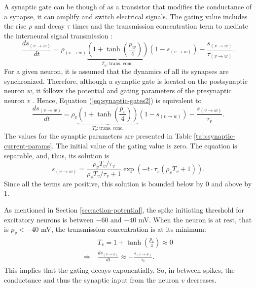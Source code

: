 A synaptic gate can be though of as a transistor that modifies the conductance of a synapse, it can amplify and switch electrical signals. The gating value includes the rise $\rho$ and decay $\tau$ times and the transmission concentration term to mediate the interneural signal transmission \cite{Destexhe1994}:
\begin{equation}
    \frac{ds_{(v \to w)}}{dt} = \rho_{(v \to w)} \underbrace{\left( 1 + \tanh \left( \frac{p_{w}}{4} \right) \right)}_{T_w: \text{trans. conc.}} (1 - s_{(v \to w)}) - \frac{s_{(v \to w)}}{\tau_{(v \to w)}}.
    \label{eq:synaptic-gates2}
\end{equation}
For a given neuron, it is assumed that the dynamics of all its synapses are synchronized. Therefore, although a synaptic gate is located on the postsynaptic neuron $w$, it follows the potential and gating parameters of the presynaptic neuron $v$ \cite{Lowet2015}. Hence, Equation (\ref{eq:synaptic-gates2}) is equivalent to
\begin{equation}
    \frac{ds_{(v \to w)}}{dt} = \rho_{v} \underbrace{\left( 1 + \tanh \left( \frac{p_{v}}{4} \right) \right)}_{T_v: \text{trans. conc.}} (1 - s_{(v \to w)}) - \frac{s_{(v \to w)}}{\tau_{v}}.
    \label{eq:synaptic-gates}
\end{equation}
The values for the synaptic parameters are presented in Table \ref{tab:synaptic-current-params}.
The initial value of the gating value is zero. The equation is separable, and, thus, its solution is
\begin{equation}
    s_{(v \to w)} = \frac{\rho_v T_v / \tau_v}{\rho_v T_v / \tau_v + 1} \exp \left( -t \cdot \tau_v (\rho_v T_v + 1)  \right).
\end{equation}
Since all the terms are positive, this solution is bounded below by $0$ and above by $1$.

As mentioned in Section \ref{sec:action-potential}, the spike initiating threshold for excitatory neurons is between $-60$ and $-40$ mV. When the neuron is at rest, that is $p_v < -40$ mV, the transmission concentration is at its minimum:
\begin{gather}
\begin{split}
    & T_v = 1 + \tanh \left( \frac{p_{v}}{4} \right) \approx 0 \\
    \Rightarrow \ & \frac{ds_{(v \to w)}}{dt} \approx - \frac{s_{(v \to w)}}{\tau_{v}}.
\end{split}
\end{gather}
This implies that the gating decays exponentially.
So, in between spikes, the conductance and thus the synaptic input from the neuron $v$ decreases. 

